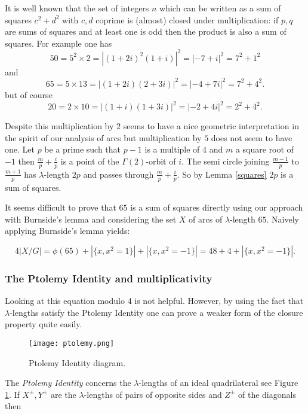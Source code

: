 \documentclass[12pt,a4paper]{amsart}
\def\g2{\Gamma(2)}
\begin{document}
It is well known that the set of integers $n$ 
which can be written as a sum of squares 
$c^2 + d^2$ with $c,d$ coprime is (almost) closed under
multiplication:
if $p,q$ are sums of squares and at least one is odd then the
product is also a sum of squares. 
For example one has
$$50 = 5^2 \times 2 = | (1+2i)^2 (1+i) |^2 = |  -7 + i |^2 = 7^2 + 1^2 $$
and
$$65 = 5 \times 13 = | (1+2i)(2+3 i) |^2 = |  -4 + 7i |^2 = 7^2 + 4^2.$$
but of course 
$$ 20 = 2 \times 10= |(1 + i)(1+ 3i)|^2 = | -2 + 4i |^2 = 2^2 + 4^2.$$

Despite this multiplication by $2$ seems to have a nice geometric interpretation
in the spirit of our analysis of arcs but multiplication by $5$
does not seem to have one.
Let $p$ be a prime such that $p-1$ is a multiple of $4$
and $m$ a square root of $-1$ then 
$\frac{m}{p} + \frac{i}{p}$
is a point of the $\g2$-orbit of $i$.
The semi circle joining $\frac{m-1}{p}$ to  $\frac{m+1}{p}$
has $\lambda$-length $2p$
and passes through 
$\frac{m}{p} + \frac{i}{p}$.
So by Lemma \ref{squares} $2p$ is a sum of squares.

It seems difficult to prove that $65$ is a sum of squares directly
using our approach with Burnside's lemma and considering  the set
$X$ of arcs of $\lambda$-length $65$. Naively applying Burnside's
lemma yields:

$$4 |X/G|   = \phi(65)+  |\{ x, x^2 = 1 \}| + |\{ x, x^2 = -1 \}| = 48 + 4 +  |\{ x, x^2 = -1 \}|.$$

\subsubsection{The Ptolemy Identity and multiplicativity}


Looking at this equation modulo 4 is not helpful. However, by using
the fact that $\lambda$-lengths satisfy the Ptolemy Identity one can
prove a weaker form of the closure property quite easily.

\begin{figure}[ht]
\begin{center}
\texttt{[image: ptolemy.png]} 
\end{center}
\caption{Ptolemy Identity diagram.}
\label{Ptolemy}
\end{figure}

The \textit{Ptolemy Identity} concerns the $\lambda$-lengths of an
ideal quadrilateral see Figure \ref{Ptolemy}. If $X^\pm, Y^\pm$ are
the  $\lambda$-lengths of pairs of  opposite sides and $Z^\pm$ of
the diagonals then
\end{document}
